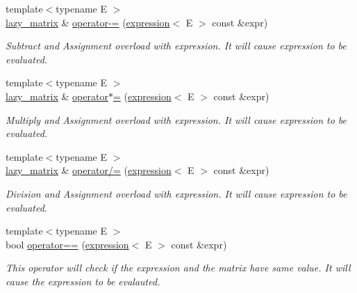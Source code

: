 \begin{DoxyCompactItemize}
{\footnotesize template$<$typename E $>$ }\\\mbox{\hyperlink{classboost_1_1test_1_1lazy__matrix}{lazy\+\_\+matrix}} \& \mbox{\hyperlink{classboost_1_1test_1_1lazy__matrix_a5c15de9d35dd185a1e6d9101861969e5}{operator-\/=}} (\mbox{\hyperlink{classboost_1_1test_1_1expression}{expression}}$<$ E $>$ const \&expr)
\begin{DoxyCompactList}\small\item\em Subtract and Assignment overload with expression. It will cause expression to be evaluated. \end{DoxyCompactList}\item 
{\footnotesize template$<$typename E $>$ }\\\mbox{\hyperlink{classboost_1_1test_1_1lazy__matrix}{lazy\+\_\+matrix}} \& \mbox{\hyperlink{classboost_1_1test_1_1lazy__matrix_a389c21e3085e09b8b7c3db7c29e163be}{operator$\ast$=}} (\mbox{\hyperlink{classboost_1_1test_1_1expression}{expression}}$<$ E $>$ const \&expr)
\begin{DoxyCompactList}\small\item\em Multiply and Assignment overload with expression. It will cause expression to be evaluated. \end{DoxyCompactList}\item 
{\footnotesize template$<$typename E $>$ }\\\mbox{\hyperlink{classboost_1_1test_1_1lazy__matrix}{lazy\+\_\+matrix}} \& \mbox{\hyperlink{classboost_1_1test_1_1lazy__matrix_a61f876fb99d8f85ee3f7cee3142ab1cf}{operator/=}} (\mbox{\hyperlink{classboost_1_1test_1_1expression}{expression}}$<$ E $>$ const \&expr)
\begin{DoxyCompactList}\small\item\em Division and Assignment overload with expression. It will cause expression to be evaluated. \end{DoxyCompactList}\item 
{\footnotesize template$<$typename E $>$ }\\bool \mbox{\hyperlink{classboost_1_1test_1_1lazy__matrix_a9767622b9b8397e16333e696e076ac08}{operator==}} (\mbox{\hyperlink{classboost_1_1test_1_1expression}{expression}}$<$ E $>$ const \&expr)
\begin{DoxyCompactList}\small\item\em This operator will check if the expression and the matrix have same value. It will cause the expression to be evalauted. \end{DoxyCompactList}\item 

\end{DoxyCompactItemize}
